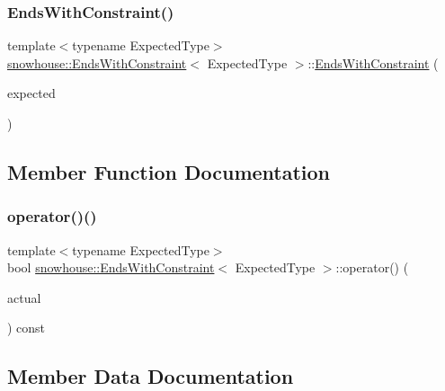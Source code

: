 \subsubsection{\texorpdfstring{EndsWithConstraint()}{EndsWithConstraint()}}
{\footnotesize\ttfamily template$<$typename Expected\+Type$>$ \\
\mbox{\hyperlink{structsnowhouse_1_1EndsWithConstraint}{snowhouse\+::\+Ends\+With\+Constraint}}$<$ Expected\+Type $>$\+::\mbox{\hyperlink{structsnowhouse_1_1EndsWithConstraint}{Ends\+With\+Constraint}} (\begin{DoxyParamCaption}\item[{const Expected\+Type \&}]{expected }\end{DoxyParamCaption})\hspace{0.3cm}{\ttfamily [inline]}}



\subsection{Member Function Documentation}
\mbox{\label{structsnowhouse_1_1EndsWithConstraint_a464e1c0f6879a7b3535ffab15496fe6b}} 
\subsubsection{\texorpdfstring{operator()()}{operator()()}}
{\footnotesize\ttfamily template$<$typename Expected\+Type$>$ \\
bool \mbox{\hyperlink{structsnowhouse_1_1EndsWithConstraint}{snowhouse\+::\+Ends\+With\+Constraint}}$<$ Expected\+Type $>$\+::operator() (\begin{DoxyParamCaption}\item[{const std\+::string \&}]{actual }\end{DoxyParamCaption}) const\hspace{0.3cm}{\ttfamily [inline]}}



\subsection{Member Data Documentation}
\mbox{\label{structsnowhouse_1_1EndsWithConstraint_ad8b73b6e472dee52069ca845e3c8bfc6}} 
